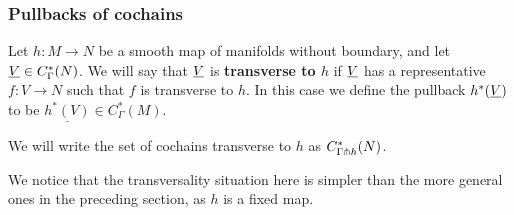 \medskip

\subsubsection{Pullbacks of cochains}

\begin{definition}\label{D: transverse to map}
Let $h \colon M \to N$ be a smooth map of manifolds without boundary, and let $\underline{V} \in C^*_\Gamma(N)$. We will say that $\underline{V}$ is \textbf{transverse to $h$} if $\underline{V}$ has a representative $f \colon V \to N$ such that $f$ is transverse to $h$. In this case we define the pullback $h^*(\underline{V})$ to be $\underline{h^*(V)} \in C^*_\Gamma(M)$.

We will write the set of cochains transverse to $h$ as $C^*_{\Gamma\pitchfork h}(N)$.
\end{definition}

We notice that the transversality situation here is simpler than the more general ones in the preceding section, as $h$ is a fixed map.

